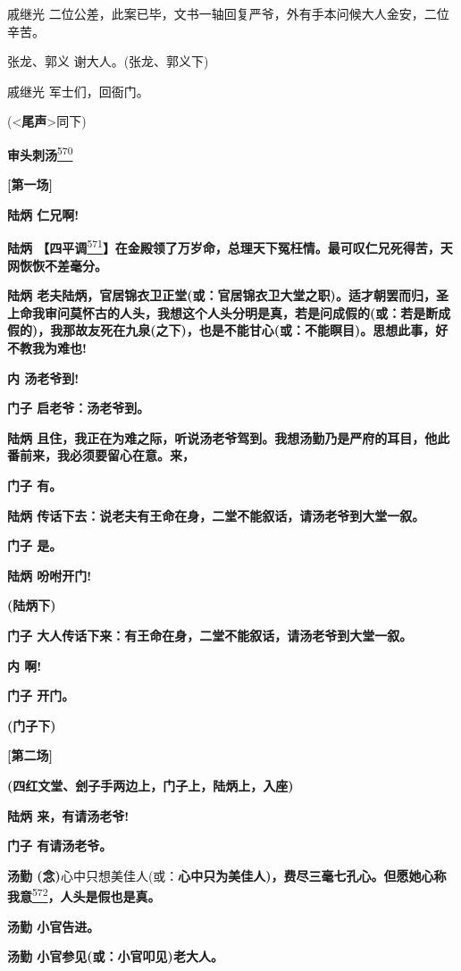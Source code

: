 戚继光
二位公差，此案已毕，文书一轴回复严爷，外有手本问候大人金安，二位辛苦。

张龙、郭义 谢大人。(张龙、郭义下)

戚继光 军士们，回衙门。

(\textless{}\textbf{尾声}\textgreater{}同下)

\textbf{审头刺汤}\protect\hyperlink{fn570}{\textsuperscript{570}}

\textbf{{[}第一场{]}}

\textbf{陆炳 仁兄啊!}

\textbf{陆炳
【四平调}\protect\hyperlink{fn571}{\textsuperscript{571}}\textbf{】在金殿领了万岁命，总理天下冤枉情。最可叹仁兄死得苦，天网恢恢不差毫分。}

\textbf{陆炳
老夫陆炳，官居锦衣卫正堂(或：官居锦衣卫大堂之职)。适才朝罢而归，圣上命我审问莫怀古的人头，我想这个人头分明是真，若是问成假的(或：若是断成假的)，我那故友死在九泉(之下)，也是不能甘心(或：不能瞑目)。思想此事，好不教我为难也!}

\textbf{内 汤老爷到!}

\textbf{门子 启老爷：汤老爷到。}

\textbf{陆炳
且住，我正在为难之际，听说汤老爷驾到。我想汤勤乃是严府的耳目，他此番前来，我必须要留心在意。来，}

\textbf{门子 有。}

\textbf{陆炳
传话下去：说老夫有王命在身，二堂不能叙话，请汤老爷到大堂一叙。}

\textbf{门子 是。}

\textbf{陆炳 吩咐开门!}

\textbf{(陆炳下)}

\textbf{门子
大人传话下来：有王命在身，二堂不能叙话，请汤老爷到大堂一叙。}

\textbf{内 啊!}

\textbf{门子 开门。}

\textbf{(门子下)}

\textbf{{[}第二场{]}}

\textbf{(四红文堂、刽子手两边上，门子上，陆炳上，入座)}

\textbf{陆炳 来，有请汤老爷!}

\textbf{门子 有请汤老爷。}

\textbf{汤勤
(念)}心中只想美佳人(或：\textbf{心中只为美佳人)，费尽三毫七孔心。但愿她心称我意}\protect\hyperlink{fn572}{\textsuperscript{572}}\textbf{，人头是假也是真。}

\textbf{汤勤 小官告进。}

\textbf{汤勤 小官参见(或：小官叩见)老大人。}

